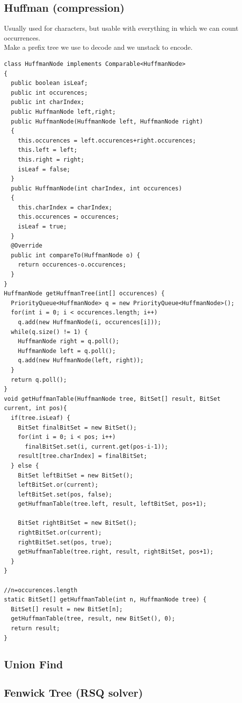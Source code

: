 \subsection{Huffman (compression)}
Usually used for characters, but usable with everything in which we can count occurrences. \\
Make a prefix tree we use to decode and we unstack to encode.
\begin{lstlisting}
class HuffmanNode implements Comparable<HuffmanNode>
{
  public boolean isLeaf;
  public int occurences;
  public int charIndex;
  public HuffmanNode left,right;
  public HuffmanNode(HuffmanNode left, HuffmanNode right)
  {
    this.occurences = left.occurences+right.occurences;
    this.left = left;
    this.right = right;
    isLeaf = false;
  } 
  public HuffmanNode(int charIndex, int occurences)
  {
    this.charIndex = charIndex;
    this.occurences = occurences;
    isLeaf = true;
  }
  @Override
  public int compareTo(HuffmanNode o) {
    return occurences-o.occurences;
  }
}
HuffmanNode getHuffmanTree(int[] occurences) {
  PriorityQueue<HuffmanNode> q = new PriorityQueue<HuffmanNode>();
  for(int i = 0; i < occurences.length; i++)
    q.add(new HuffmanNode(i, occurences[i]));
  while(q.size() != 1) {
    HuffmanNode right = q.poll();
    HuffmanNode left = q.poll();
    q.add(new HuffmanNode(left, right));
  }
  return q.poll();
}
void getHuffmanTable(HuffmanNode tree, BitSet[] result, BitSet current, int pos){
  if(tree.isLeaf) {
    BitSet finalBitSet = new BitSet();
    for(int i = 0; i < pos; i++)
      finalBitSet.set(i, current.get(pos-i-1));
    result[tree.charIndex] = finalBitSet;
  } else {
    BitSet leftBitSet = new BitSet();
    leftBitSet.or(current);
    leftBitSet.set(pos, false);
    getHuffmanTable(tree.left, result, leftBitSet, pos+1);
            
    BitSet rightBitSet = new BitSet();
    rightBitSet.or(current);
    rightBitSet.set(pos, true);
    getHuffmanTable(tree.right, result, rightBitSet, pos+1);
  }
}
    
//n=occurences.length
static BitSet[] getHuffmanTable(int n, HuffmanNode tree) {
  BitSet[] result = new BitSet[n];
  getHuffmanTable(tree, result, new BitSet(), 0);
  return result;
}
\end{lstlisting}
\subsection{Union Find}

\subsection{Fenwick Tree (RSQ solver)}

